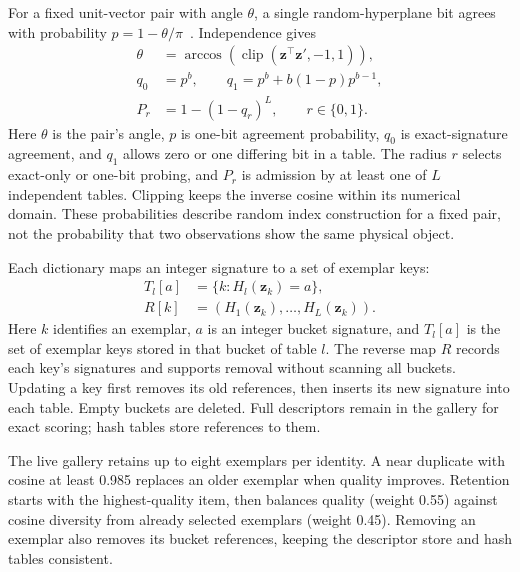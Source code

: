 \documentclass[conference]{IEEEtran}
\begin{document}
For a fixed unit-vector pair with angle $\theta$, a single random-hyperplane bit agrees with probability $p=1-\theta/\pi$~\cite{charikar2002}. Independence gives
\begin{equation}
\begin{aligned}
\theta&=\arccos(\operatorname{clip}(\mathbf z^\top\mathbf z',-1,1)),\\
q_0&=p^b,\qquad q_1=p^b+b(1-p)p^{b-1},\\
P_r&=1-(1-q_r)^L,\qquad r\in\{0,1\}.
\end{aligned}
\label{eq:probability}
\end{equation}
Here $\theta$ is the pair's angle, $p$ is one-bit agreement probability, $q_0$ is exact-signature agreement, and $q_1$ allows zero or one differing bit in a table. The radius $r$ selects exact-only or one-bit probing, and $P_r$ is admission by at least one of $L$ independent tables. Clipping keeps the inverse cosine within its numerical domain. These probabilities describe random index construction for a fixed pair, not the probability that two observations show the same physical object.

Each dictionary maps an integer signature to a set of exemplar keys:
\begin{equation}
\begin{aligned}
T_l[a]&=\{k:H_l(\mathbf z_k)=a\},\\
R[k]&=(H_1(\mathbf z_k),\ldots,H_L(\mathbf z_k)).
\end{aligned}
\end{equation}
Here $k$ identifies an exemplar, $a$ is an integer bucket signature, and $T_l[a]$ is the set of exemplar keys stored in that bucket of table $l$. The reverse map $R$ records each key's signatures and supports removal without scanning all buckets. Updating a key first removes its old references, then inserts its new signature into each table. Empty buckets are deleted. Full descriptors remain in the gallery for exact scoring; hash tables store references to them.

The live gallery retains up to eight exemplars per identity. A near duplicate with cosine at least 0.985 replaces an older exemplar when quality improves. Retention starts with the highest-quality item, then balances quality (weight 0.55) against cosine diversity from already selected exemplars (weight 0.45). Removing an exemplar also removes its bucket references, keeping the descriptor store and hash tables consistent.
\end{document}
